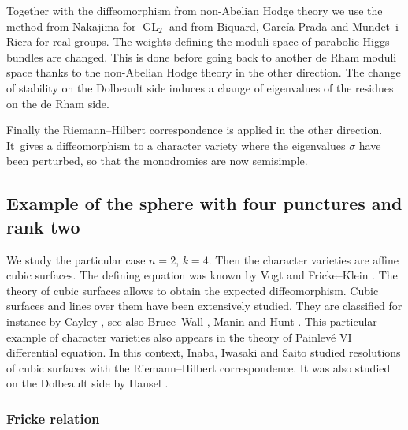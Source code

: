 \documentclass[11pt]{article}
\theoremstyle{definition}
\theoremstyle{plain}
\DeclareMathOperator{\GL}{GL}
\begin{document}
Together with the diffeomorphism from non-Abelian Hodge theory we use the method from Nakajima \cite{Nakajima_1996} for $\GL_2$ and from Biquard, García-Prada and Mundet~i Riera \cite{Biquard_Garcia_Prada_Riera} for real groups. The weights defining the moduli space of parabolic Higgs bundles are changed. This is done before going back to another de Rham moduli space thanks to the non-Abelian Hodge theory in the other direction. The change of stability on the Dolbeault side induces a change of eigenvalues of the residues on the de Rham side.

Finally the Riemann--Hilbert correspondence is applied in the other direction. It~gives a diffeomorphism to a character variety where the eigenvalues $\sigma$ have been perturbed, so that the monodromies are now semisimple.

\subsection{Example of the sphere with four punctures and rank two}\label{sect_example_sphere}
We study the particular case $n=2$, $k=4$. Then the character varieties are affine cubic surfaces. The defining equation was known by Vogt \cite{Vogt} and Fricke--Klein \cite{Fricke_Klein}. The theory of cubic surfaces allows to obtain the expected diffeomorphism. Cubic surfaces and lines over them have been extensively studied. They are classified for instance by Cayley \cite{Cayley}, see also Bruce--Wall \cite{Bruce_cubic}, Manin \cite{Manin1986} and Hunt \cite{Hunt}. This particular example of character varieties also appears in the theory of Painlevé VI differential equation. In this context, Inaba, Iwasaki and Saito \cite{Inaba_Iwasaki_Saito,Inaba_Iwasaki_Saito_I,Inaba_Iwasaki_Saito_II} studied resolutions of cubic surfaces with the Riemann--Hilbert correspondence. It was also studied on the Dolbeault side by Hausel \cite{Hausel98}.

\subsubsection{Fricke relation}
\end{document}
